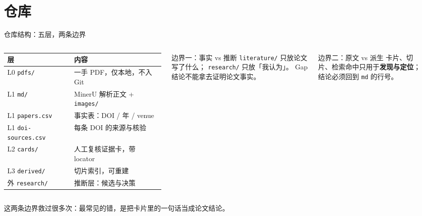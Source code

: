 \section{仓库}

\begin{frame}{仓库结构：五层，两条边界}
  \vspace{-2pt}
  \begin{columns}[T]
    \scriptsize
    \begin{tabular}{@{}ll@{}}
      \toprule
      层 & 内容 \\
      \midrule
      L0 \texttt{pdfs/} & 一手 PDF，仅本地，不入 Git \\
      L1 \texttt{md/} & MinerU 解析正文 + \texttt{images/} \\
      L1 \texttt{papers.csv} & 事实表：DOI / 年 / venue \\
      L1 \texttt{doi-sources.csv} & 每条 DOI 的来源与核验 \\
      L2 \texttt{cards/} & 人工复核证据卡，带 locator \\
      L3 \texttt{derived/} & 切片索引，可重建 \\
      外 \texttt{research/} & 推断层：候选与决策 \\
      \bottomrule
    \end{tabular}

    \footnotesize
    \begin{alertblock}{边界一：事实 vs 推断}
      \scriptsize
      \texttt{literature/} 只放论文写了什么；
      \texttt{research/} 只放「我认为」。
      Gap 结论不能拿去证明论文事实。
    \end{alertblock}

    \begin{alertblock}{边界二：原文 vs 派生}
      \scriptsize
      卡片、切片、检索命中只用于\textbf{发现与定位}；
      结论必须回到 \texttt{md} 的行号。
    \end{alertblock}
  \end{columns}

  \vspace{0.4em}
  {\scriptsize \color{gray} 这两条边界救过很多次：最常见的错，是把卡片里的一句话当成论文结论。}
\end{frame}


